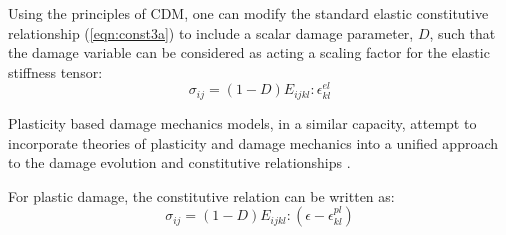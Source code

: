 Using the principles of CDM, one can modify the standard elastic constitutive relationship (\ref{eqn:const3a}) to include a scalar damage parameter, $D$, such that the damage variable can be considered as acting a scaling factor for the elastic stiffness tensor: 
\begin{equation}
\sigma_{ij}=\left(1-D\right)E_{ijkl}:\epsilon^{el}_{kl}
\label{eqn:const3}
\end{equation}





Plasticity based damage mechanics models, in a similar capacity, attempt to incorporate theories of plasticity and damage mechanics into a unified approach to the damage evolution and constitutive relationships \cite{zhang_continuum_2010}. 

For plastic damage, the constitutive relation can be written as:
\begin{equation}
\sigma_{ij}=\left(1-D\right)E_{ijkl}:\left(\epsilon-\epsilon^{pl}_{kl}\right)
\label{eqn:const5}
\end{equation}

